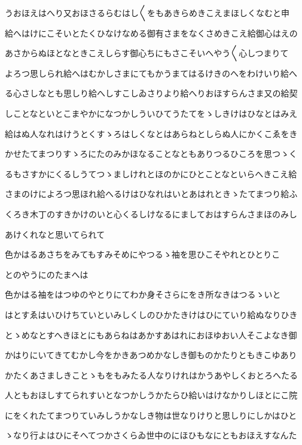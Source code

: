 \documentclass[a4paper,11pt,landscape]{ltjtarticle}
\begin{document}
\par\medskip
うおほえはへり又おほさるらむはし〱をもあきらめきこえまほしくなむと申
\par\medskip
給へはけにこそいとたくひなけなめる御有さまをなくさめきこえ給御心はえの
\par\medskip
あさからぬほとなときこえしらす御心ちにもさこそいへやう〱心しつまりて
\par\medskip
よろつ思しられ給へはむかしさまにてもかうまてはるけきのへをわけいり給へ
\par\medskip
る心さしなとも思しり給へしすこしゐさりより給へりおほすらんさま又の給契
\par\medskip
しことなといとこまやかになつかしういひてうたてをゝしきけはひなとはみえ
\par\medskip
給はぬ人なれはけうとくすゝろはしくなとはあらねとしらぬ人にかくこゑをき
\par\medskip
かせたてまつりすゝろにたのみかほなることなともありつるひころを思つゝく
\par\medskip
るもさすかにくるしうてつゝましけれとほのかにひとことなといらへきこえ給
\par\medskip
さまのけによろつ思ほれ給へるけはひなれはいとあはれときゝたてまつり給ふ
\par\medskip
くろき木丁のすきかけのいと心くるしけなるにましておはすらんさまほのみし
\par\medskip
あけくれなと思いてられて
\par\medskip
色かはるあさちをみてもすみそめにやつるゝ袖を思ひこそやれとひとりこ
\par\medskip
とのやうにのたまへは
\par\medskip
色かはる袖をはつゆのやとりにてわか身そさらにをき所なきはつるゝいと
\par\medskip
はとすゑはいひけちていといみしくしのひかたきけはひにていり給ぬなりひき
\par\medskip
とゝめなとすへきほとにもあらねはあかすあはれにおほゆおい人そこよなき御
\par\medskip
かはりにいてきてむかし今をかきあつめかなしき御ものかたりともきこゆあり
\par\medskip
かたくあさましきことゝもをもみたる人なりけれはかうあやしくおとろへたる
\par\medskip
人ともおほしすてられすいとなつかしうかたらひ給いはけなかりしほとにこ院
\par\medskip
にをくれたてまつりていみしうかなしき物は世なりけりと思しりにしかはひと
\par\medskip
ゝなり行よはひにそへてつかさくらゐ世中のにほひもなにともおほえすなんた
\end{document}
